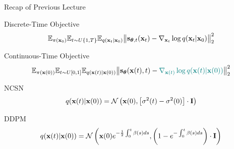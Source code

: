 \documentclass{beamer}
\begin{document}
\begin{frame}{Recap of Previous Lecture}
	\begin{block}{Discrete-Time Objective}
		\vspace{-0.3cm}
		\[
			\mathbb{E}_{\pi(\mathbf{x}_0)} \mathbb{E}_{t \sim U\{1, T\}} \mathbb{E}_{q(\mathbf{x}_t | \mathbf{x}_0)}\bigl\| \mathbf{s}_{\boldsymbol{\theta}, t}(\mathbf{x}_t) - \nabla_{\mathbf{x}_t} \log q(\mathbf{x}_t | \mathbf{x}_0) \bigr\|^2_2 
		\]
		\vspace{-0.5cm}
	\end{block}
	\begin{block}{Continuous-Time Objective}
		\vspace{-0.5cm}
		\[
			\mathbb{E}_{\pi(\mathbf{x}(0))} \mathbb{E}_{t \sim U[0, 1]} \mathbb{E}_{q(\mathbf{x}(t) | \mathbf{x}(0))}\bigl\| \mathbf{s}_{\boldsymbol{\theta}}(\mathbf{x}(t), t) - {\color{teal}\nabla_{\mathbf{x}(t)} \log q(\mathbf{x}(t) | \mathbf{x}(0))} \bigr\|^2_2 
		\]
		\vspace{-0.5cm}
	\end{block}
	\begin{block}{NCSN}
		\vspace{-0.3cm}
		\[
			q(\mathbf{x}(t) | \mathbf{x}(0)) = \mathcal{N}\left(\mathbf{x}(0), \left[\sigma^2(t) - \sigma^2(0)\right] \cdot \mathbf{I}\right)
		\]
		\vspace{-0.5cm}
	\end{block}
	\begin{block}{DDPM}
		\vspace{-0.3cm}
		\[
			q(\mathbf{x}(t) | \mathbf{x}(0)) = \mathcal{N}\left(\mathbf{x}(0) e^{-\frac{1}{2} \int_0^t\beta(s)ds}, \left(1 - e^{- \int_0^t\beta(s)ds}\right) \cdot \mathbf{I}\right)
		\]
		\vspace{-0.5cm}
	\end{block}
	
\end{frame}
\end{document}
